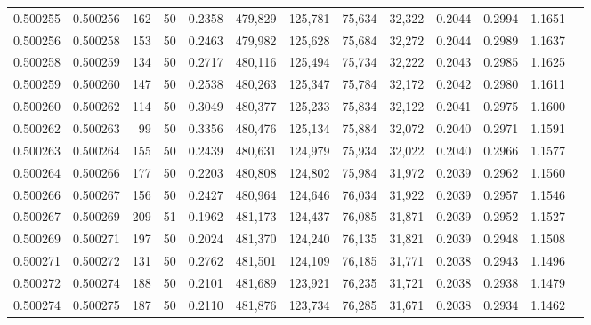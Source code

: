 \begin{tabular}{rrrrrrrrrrrrr}
0.500255 & 0.500256 & 162 &  50 &                                     0.2358 & 479,829 & 125,781 &  75,634 &  32,322 & 0.2044 & 0.2994 & 1.1651 \\
0.500256 & 0.500258 & 153 &  50 &                                     0.2463 & 479,982 & 125,628 &  75,684 &  32,272 & 0.2044 & 0.2989 & 1.1637 \\
0.500258 & 0.500259 & 134 &  50 &                                     0.2717 & 480,116 & 125,494 &  75,734 &  32,222 & 0.2043 & 0.2985 & 1.1625 \\
0.500259 & 0.500260 & 147 &  50 &                                     0.2538 & 480,263 & 125,347 &  75,784 &  32,172 & 0.2042 & 0.2980 & 1.1611 \\
0.500260 & 0.500262 & 114 &  50 &                                     0.3049 & 480,377 & 125,233 &  75,834 &  32,122 & 0.2041 & 0.2975 & 1.1600 \\
0.500262 & 0.500263 &  99 &  50 &                                     0.3356 & 480,476 & 125,134 &  75,884 &  32,072 & 0.2040 & 0.2971 & 1.1591 \\
0.500263 & 0.500264 & 155 &  50 &                                     0.2439 & 480,631 & 124,979 &  75,934 &  32,022 & 0.2040 & 0.2966 & 1.1577 \\
0.500264 & 0.500266 & 177 &  50 &                                     0.2203 & 480,808 & 124,802 &  75,984 &  31,972 & 0.2039 & 0.2962 & 1.1560 \\
0.500266 & 0.500267 & 156 &  50 &                                     0.2427 & 480,964 & 124,646 &  76,034 &  31,922 & 0.2039 & 0.2957 & 1.1546 \\
0.500267 & 0.500269 & 209 &  51 &                                     0.1962 & 481,173 & 124,437 &  76,085 &  31,871 & 0.2039 & 0.2952 & 1.1527 \\
0.500269 & 0.500271 & 197 &  50 &                                     0.2024 & 481,370 & 124,240 &  76,135 &  31,821 & 0.2039 & 0.2948 & 1.1508 \\
0.500271 & 0.500272 & 131 &  50 &                                     0.2762 & 481,501 & 124,109 &  76,185 &  31,771 & 0.2038 & 0.2943 & 1.1496 \\
0.500272 & 0.500274 & 188 &  50 &                                     0.2101 & 481,689 & 123,921 &  76,235 &  31,721 & 0.2038 & 0.2938 & 1.1479 \\
0.500274 & 0.500275 & 187 &  50 &                                     0.2110 & 481,876 & 123,734 &  76,285 &  31,671 & 0.2038 & 0.2934 & 1.1462 \\

\end{tabular}
